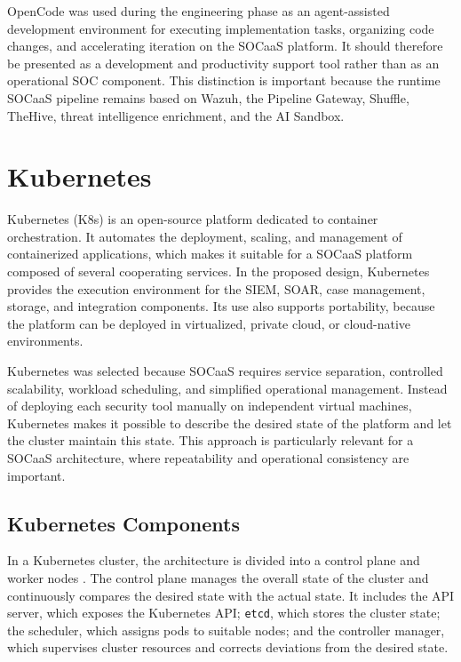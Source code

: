 OpenCode was used during the engineering phase as an agent-assisted development environment for executing implementation tasks, organizing code changes, and accelerating iteration on the SOCaaS platform. It should therefore be presented as a development and productivity support tool rather than as an operational SOC component. This distinction is important because the runtime SOCaaS pipeline remains based on Wazuh, the Pipeline Gateway, Shuffle, TheHive, threat intelligence enrichment, and the AI Sandbox.

\section{Kubernetes}
\label{sec:kubernetes}

Kubernetes (K8s) is an open-source platform dedicated to container orchestration. It automates the deployment, scaling, and management of containerized applications, which makes it suitable for a SOCaaS platform composed of several cooperating services. In the proposed design, Kubernetes provides the execution environment for the SIEM, SOAR, case management, storage, and integration components. Its use also supports portability, because the platform can be deployed in virtualized, private cloud, or cloud-native environments.

Kubernetes was selected because SOCaaS requires service separation, controlled scalability, workload scheduling, and simplified operational management. Instead of deploying each security tool manually on independent virtual machines, Kubernetes makes it possible to describe the desired state of the platform and let the cluster maintain this state. This approach is particularly relevant for a SOCaaS architecture, where repeatability and operational consistency are important.

\subsection{Kubernetes Components}
\label{subsec:k8s-components}

In a Kubernetes cluster, the architecture is divided into a control plane and worker nodes \cite{k8s-docs}. The control plane manages the overall state of the cluster and continuously compares the desired state with the actual state. It includes the API server, which exposes the Kubernetes API; \texttt{etcd}, which stores the cluster state; the scheduler, which assigns pods to suitable nodes; and the controller manager, which supervises cluster resources and corrects deviations from the desired state.

